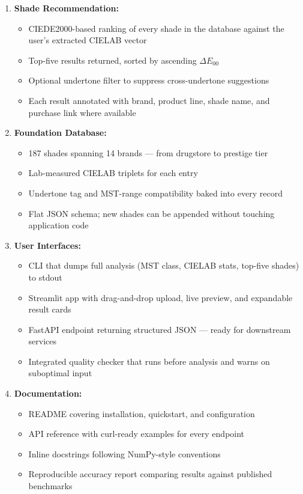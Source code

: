 \begin{enumerate}
    \item \textbf{Shade Recommendation:}
    \begin{itemize}
        \item CIEDE2000-based ranking of every shade in the database against the user's extracted CIELAB vector
        \item Top-five results returned, sorted by ascending $\Delta E_{00}$
        \item Optional undertone filter to suppress cross-undertone suggestions
        \item Each result annotated with brand, product line, shade name, and purchase link where available
    \end{itemize}
    
    \item \textbf{Foundation Database:}
    \begin{itemize}
        \item 187 shades spanning 14 brands — from drugstore to prestige tier
        \item Lab-measured CIELAB triplets for each entry
        \item Undertone tag and MST-range compatibility baked into every record
        \item Flat JSON schema; new shades can be appended without touching application code
    \end{itemize}
    
    \item \textbf{User Interfaces:}
    \begin{itemize}
        \item CLI that dumps full analysis (MST class, CIELAB stats, top-five shades) to stdout
        \item Streamlit app with drag-and-drop upload, live preview, and expandable result cards
        \item FastAPI endpoint returning structured JSON — ready for downstream services
        \item Integrated quality checker that runs before analysis and warns on suboptimal input
    \end{itemize}
    
    \item \textbf{Documentation:}
    \begin{itemize}
        \item README covering installation, quickstart, and configuration
        \item API reference with curl-ready examples for every endpoint
        \item Inline docstrings following NumPy-style conventions
        \item Reproducible accuracy report comparing results against published benchmarks
    \end{itemize}
\end{enumerate}

